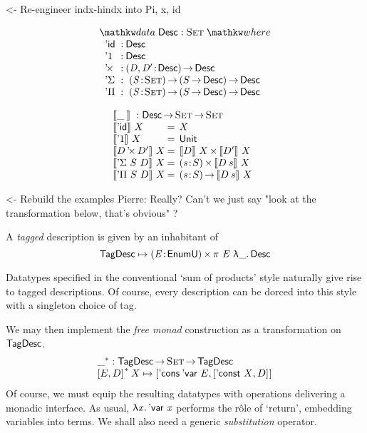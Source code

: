 \documentclass[preprint, authoryear]{sigplanconf}
\newenvironment{structure}{\footnotesize\verbatim}{\endverbatim}
\begin{document}
\begin{structure}
<- Re-engineer indx-hindx into Pi, x, id
\end{structure}

\[
\stk{
\data \Desc : \Set \where \\
\;\;\begin{array}{@{}l@{\::\:}l@{\quad}l}
    \DId            & \Desc                                   \\
    \DUnit          & \Desc                                   \\
    \DProd{}{}      & \PI{\V{D}, \V{D'}}{\Desc} \Desc         \\
    \DSigma         & \PI{\V{S}}{\Set} \PIS{S \To \Desc} \Desc \\
    \DPi            & \PI{\V{S}}{\Set} \PIS{S \To \Desc} \Desc 
\end{array}
}
\]

\[\stk{
\descop{\_\:}{} : \Desc \To \Set \To \Set \\
\begin{array}{@{}l@{\:=\:\:}ll}
\descop{\DId}{X}          &  X                                           \\
\descop{\DUnit}{X}        &  \Unit                                       \\
\descop{\DProd{D}{D'}}{X} &  \TIMES{\descop{D}{X}}{\descop{D'}{X}}       \\
\descop{\DSigma{S}{D}}{X} &  \SIGMA{\V{s}}{S} \descop{D\: s}{X}                \\
\descop{\DPi{S}{D}}{X}    &  \PI{\V{s}}{S} \descop{D\: s}{X}            
\end{array}
}\]

\begin{structure}
<- Rebuild the examples
Pierre: Really? Can't we just say "look at the transformation below, that's obvious" ?
\end{structure}

A \emph{tagged} description is given by an inhabitant of
\[
 \F{TagDesc} \mapsto \SIGMA{\V{E}}{\EnumU}\spi{\V{E}}{\LAM{\_}\Desc}
\]


\newcommand{\FM}[1]{{#1}^{\F{\(\ast\)}}}
Datatypes specified in the conventional `sum of products' style naturally give rise to tagged descriptions. Of course, every description can be dorced into this style with a singleton choice of tag.

We may then implement the \emph{free monad} construction as a
transformation on \(\F{TagDesc}\).
\[\stk{
\FM{\_} : \F{TagDesc} \To \Set \To \F{TagDesc} \\
\FM{\pair{E}{D}{}}\:X \mapsto
\pair{\ListCons{\:\DVar{}}{E}}{\pair{\DConst{X}}{D}{}}{}
}\]
Of course, we must equip the resulting datatypes with operations delivering a monadic interface. As usual, \(\LAM{\x}\DVar{\x}\) performs the r\^ole of `return', embedding variables into terms. We shall also need a generic \emph{substitution} operator.
\end{document}

